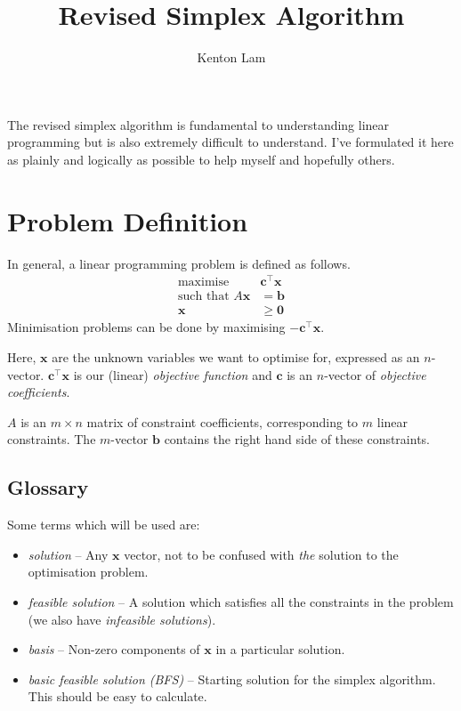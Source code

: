 \documentclass[11pt,a4paper]{article} %
\title{Revised Simplex Algorithm}
\author{Kenton Lam}
\begin{document}
\maketitle

The revised simplex algorithm is fundamental to understanding 
linear programming but is also extremely difficult to understand.
I've formulated it here as plainly and logically as possible 
to help myself and hopefully others.


\section{Problem Definition}
In general, a linear programming problem is defined as follows. 
\begin{align*}
    \text{maximise }&\bm c^\top \bm x \\ 
    \text{such that } A\bm x &= \bm b \\ 
    \bm x &\ge \bm 0
\end{align*}
Minimisation problems can be done by maximising $-\bm c^\top \bm x$.

Here, $\bm x$ are the unknown variables we want to optimise for, 
expressed as an $n$-vector. 
$\bm c^\top \bm x$ is our (linear) \textit{objective function} and $\bm c$ 
is an $n$-vector of \textit{objective coefficients}.

$A$ is an $m\times n$ matrix of constraint coefficients, 
corresponding to $m$ linear constraints. The $m$-vector $\bm b$ 
contains the right hand side of these constraints.

\subsection{Glossary}
Some terms which will be used are:
\begin{itemize}
    \item \textit{solution} -- Any $\bm x$ vector, not to be confused with \textit{the} solution to the optimisation problem.
    \item \textit{feasible solution} -- A solution which satisfies all the constraints in the problem (we also have \textit{infeasible solutions}).
    \item \textit{basis} -- Non-zero components of $\bm x$ in a particular solution.
    \item \textit{basic feasible solution (BFS)} -- Starting solution for the simplex algorithm.
    This should be easy to calculate. 
\end{itemize}
\end{document}
